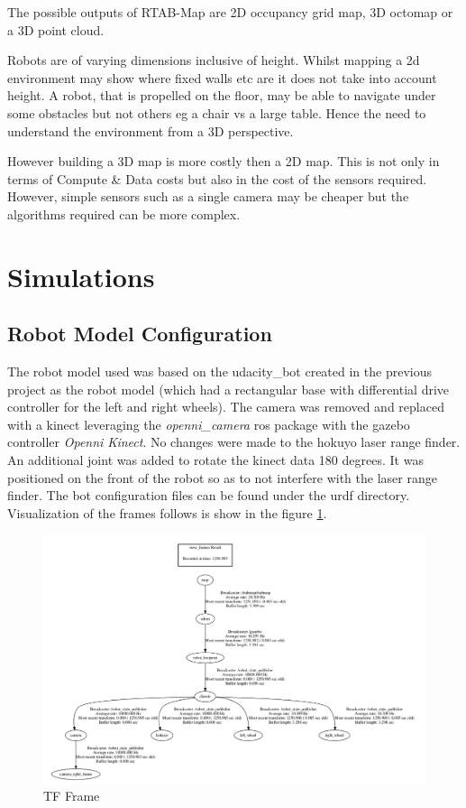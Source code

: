 \documentclass[10pt,journal,compsoc]{IEEEtran}
\begin{document}
The possible outputs of RTAB-Map are 2D occupancy grid map, 3D octomap or a 3D point cloud.

Robots are of varying dimensions inclusive of height. Whilst mapping a 2d environment may show where fixed walls etc are it does not take into account height. A robot, that is propelled on the floor, may be able to navigate under some obstacles but not others eg a chair vs a large table. Hence the need to understand the environment from a 3D perspective.

However building a 3D map is more costly then a 2D map. This is not only in terms of Compute \& Data costs but also in the cost of the sensors required. However, simple sensors such as a single camera may be cheaper but the algorithms required can be more complex.


\section{Simulations}

\subsection{Robot Model Configuration}
The robot model used was based on the udacity\_bot created in the previous project as the  robot model (which had a rectangular base with differential drive controller for the left and right wheels). The camera was removed and replaced with a kinect leveraging the \emph{openni\_camera} ros package with the gazebo controller \emph{Openni Kinect}.
No changes were made to the hokuyo laser range finder.
An additional joint was added to rotate the kinect data 180 degrees. It was positioned on the front of the robot so as to not interfere with the laser range finder.
The bot configuration files can be found under the urdf directory.
Visualization of the frames follows is show in the figure \ref{fig:frame}.

\begin{figure}[thpb]
      \centering
      \includegraphics[width=\linewidth]{images/tfframe}
      \caption{TF Frame}
      \label{fig:frame}
\end{figure}
\end{document}
